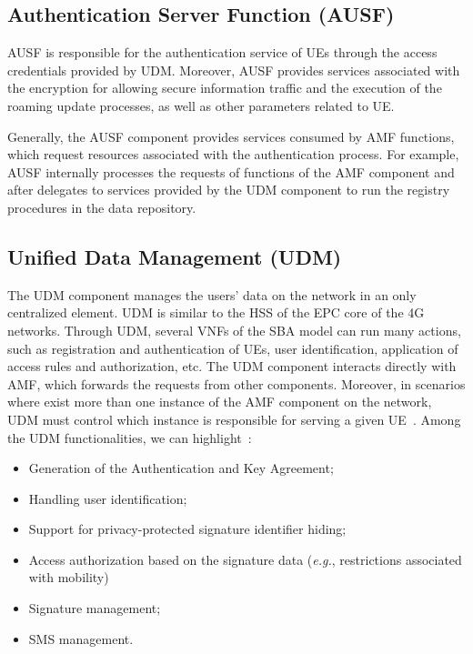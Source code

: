  
\subsection*{Authentication Server Function (AUSF)}

AUSF is responsible for the authentication service of UEs through the access credentials provided by UDM. Moreover, AUSF provides services associated with the encryption for allowing secure information traffic and the execution of the roaming update processes, as well as other parameters related to UE.

Generally, the AUSF component provides services consumed by AMF functions, which request resources associated with the authentication process. For example, AUSF internally processes the requests of functions of the AMF component and after delegates to services provided by the UDM component to run the registry procedures in the data repository.

\subsection*{Unified Data Management (UDM)} 

The UDM component manages the users' data on the network in an only centralized element. UDM is similar to the HSS of the EPC core of the 4G networks. Through UDM, several VNFs of the SBA model can run many actions, such as registration and authentication of UEs, user identification, application of access rules and authorization, etc. The UDM component interacts directly with AMF, which forwards the requests from other components. Moreover, in scenarios where exist more than one instance of the AMF component on the network, UDM must control which instance is responsible for serving a given UE~\cite{toskala20205}. Among the UDM functionalities, we can highlight~\cite{etsiTS:123501}:

\begin{itemize}
    \item Generation of the Authentication and Key Agreement;
    \item Handling user identification;
    \item Support for privacy-protected signature identifier hiding;
    \item Access authorization based on the signature data (\textit{e.g.}, restrictions associated with mobility)
    \item Signature management;
    \item SMS management.
\end {itemize}

